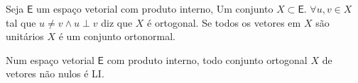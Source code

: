 \documentclass[10pt,a4paper]{article}
\begin{document}
\begin{definition}
	Seja $\textsf{E}$ um espaço vetorial com produto interno, Um conjunto $X \subset \textsf{E}$. $\forall u, v \in X$ tal que $u \neq v \land u \perp v $ diz que $X$ é ortogonal. Se todos os vetores em $X$ são unitários $X$ é um conjunto ortonormal.
\end{definition}

\begin{theorem}
	Num espaço vetorial $\textsf{E}$ com produto interno, todo conjunto ortogonal $X$ de vetores não nulos é LI.
\end{theorem}
\end{document}
